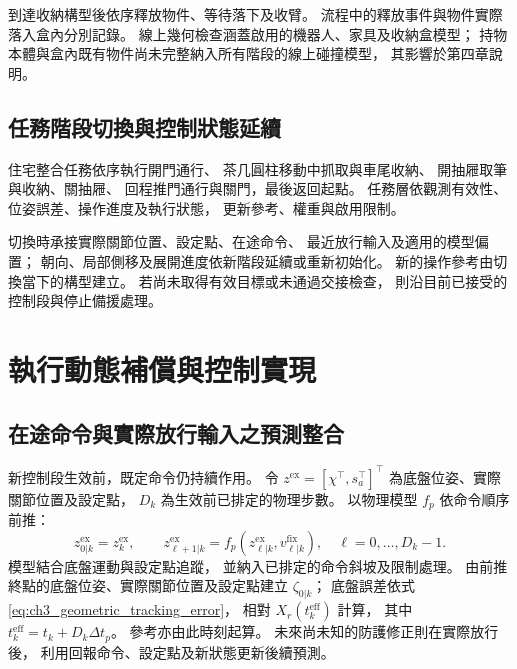 到達收納構型後依序釋放物件、等待落下及收臂。
流程中的釋放事件與物件實際落入盒內分別記錄。
線上幾何檢查涵蓋啟用的機器人、家具及收納盒模型；
持物本體與盒內既有物件尚未完整納入所有階段的線上碰撞模型，
其影響於第四章說明。

\subsection{任務階段切換與控制狀態延續}
\label{subsec:task_transition_continuity}

住宅整合任務依序執行開門通行、
茶几圓柱移動中抓取與車尾收納、
開抽屜取筆與收納、關抽屜、
回程推門通行與關門，最後返回起點。
任務層依觀測有效性、位姿誤差、操作進度及執行狀態，
更新參考、權重與啟用限制。

切換時承接實際關節位置、設定點、在途命令、
最近放行輸入及適用的模型偏置；
朝向、局部側移及展開進度依新階段延續或重新初始化。
新的操作參考由切換當下的構型建立。
若尚未取得有效目標或未通過交接檢查，
則沿目前已接受的控制段與停止備援處理。

\section{執行動態補償與控制實現}
\label{sec:execution_compensation}

\subsection{在途命令與實際放行輸入之預測整合}
\label{subsec:queued_applied_command_prediction}

新控制段生效前，既定命令仍持續作用。
令 $z^{\mathrm{ex}}=[\chi^\top,s_a^\top]^\top$
為底盤位姿、實際關節位置及設定點，
$D_k$ 為生效前已排定的物理步數。
以物理模型 $f_p$ 依命令順序前推：
\begin{equation}
    z_{0|k}^{\mathrm{ex}}=z_k^{\mathrm{ex}},\qquad
    z_{\ell+1|k}^{\mathrm{ex}}=
    f_p(z_{\ell|k}^{\mathrm{ex}},v_{\ell|k}^{\mathrm{fix}}),
    \quad \ell=0,\ldots,D_k-1 .
    \label{eq:ch3_queued_command_forward_prediction}
\end{equation}
模型結合底盤運動與設定點追蹤，
並納入已排定的命令斜坡及限制處理。
由前推終點的底盤位姿、實際關節位置及設定點建立 $\zeta_{0|k}$；
底盤誤差依式\eqref{eq:ch3_geometric_tracking_error}，
相對 $X_r(t_k^{\mathrm{eff}})$ 計算，
其中 $t_k^{\mathrm{eff}}=t_k+D_k\Delta t_p$。
參考亦由此時刻起算。
未來尚未知的防護修正則在實際放行後，
利用回報命令、設定點及新狀態更新後續預測。

